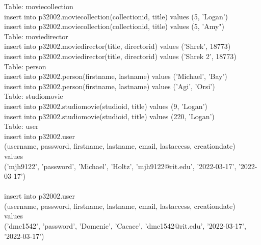\documentclass[12pt]{article}
\begin{document}
    \noindent Table: movie\textunderscore collection\\
    insert into p320\textunderscore02.movie\textunderscore collection(collection\textunderscore id, title) values (5, 'Logan')\\
    insert into p320\textunderscore02.movie\textunderscore collection(collection\textunderscore id, title) values (5, 'Amy")\\

    \noindent Table: movie\textunderscore director\\
    insert into p320\textunderscore02.movie\textunderscore director(title, director\textunderscore id) values ('Shrek', 18773)\\
    insert into p320\textunderscore02.movie\textunderscore director(title, director\textunderscore id) values ('Shrek 2', 18773)\\

    \noindent Table: person\\
    insert into p320\textunderscore02.person(first\textunderscore name, last\textunderscore name) values ('Michael', 'Bay')\\
    insert into p320\textunderscore02.person(first\textunderscore name, last\textunderscore name) values ('Agi', 'Orsi')\\

    \noindent Table: studio\textunderscore movie\\
    insert into p320\textunderscore02.studio\textunderscore movie(studio\textunderscore id, title) values (9, 'Logan')\\
    insert into p320\textunderscore02.studio\textunderscore movie(studio\textunderscore id, title) values (220, 'Logan')\\

    \noindent Table: user\\
    insert into p320\textunderscore02.user \\(username, password, first\textunderscore name, last\textunderscore name, email, last\textunderscore access, creation\textunderscore date) \\
    values \\ ('mjh9122', 'password', 'Michael', 'Holtz', 'mjh9122@rit.edu', '2022-03-17', '2022-03-17')\\ \\
    insert into p320\textunderscore02.user \\(username, password, first\textunderscore name, last\textunderscore name, email, last\textunderscore access, creation\textunderscore date) \\
    values \\('dmc1542', 'password', 'Domenic', 'Cacace', 'dmc1542@rit.edu', '2022-03-17', '2022-03-17')\\
\end{document}
